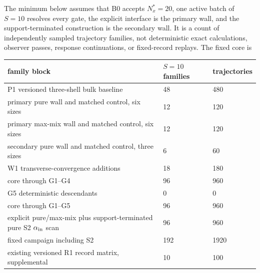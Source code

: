 \documentclass[aps,prx,twocolumn,floatfix,nofootinbib,superscriptaddress,longbibliography]{revtex4-2}
\newcommand{\campaignTableSetup}{%
  \footnotesize
  \setlength{\tabcolsep}{4pt}%
  \renewcommand{\arraystretch}{1.12}%
}
\begin{document}
The minimum below assumes that B0 accepts $N_x^*=20$, one active batch of $S=10$ resolves
every gate, the explicit interface is the primary wall, and the support-terminated
construction is the secondary wall.  It is a count of independently sampled trajectory
families, not deterministic exact calculations, observer passes, response continuations,
or fixed-record replays.  The fixed core is
\begin{widetext}
\begin{center}
\campaignTableSetup
\begin{tabularx}{\textwidth}{@{}L{2.10}L{0.45}L{0.45}@{}}
\toprule
family block & $S=10$ families & trajectories \\
\midrule
P1 versioned three-shell bulk baseline & 48 & 480 \\
primary pure wall and matched control, six sizes & 12 & 120 \\
primary max-mix wall and matched control, six sizes & 12 & 120 \\
secondary pure wall and matched control, three sizes & 6 & 60 \\
W1 transverse-convergence additions & 18 & 180 \\
\midrule
core through G1--G4 & 96 & 960 \\
G5 deterministic descendants & 0 & 0 \\
\midrule
core through G1--G5 & 96 & 960 \\
explicit pure/max-mix plus support-terminated pure S2 $\alpha_{\rm in}$ scan & 96 & 960 \\
\midrule
fixed campaign including S2 & 192 & 1920 \\
existing versioned R1 record matrix, supplemental & 10 & 100 \\
\bottomrule
\end{tabularx}
\end{center}
\end{widetext}
\end{document}
